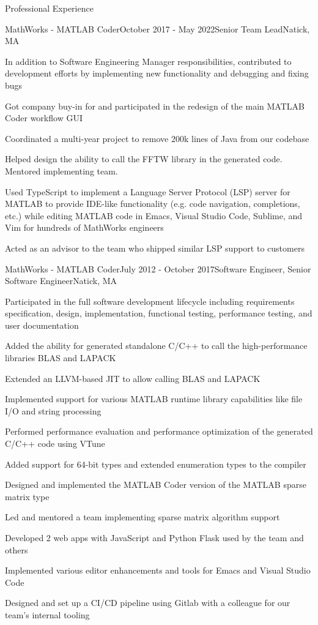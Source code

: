 \documentclass[
	usletter %
	10pt, %
]{resume} %
\begin{document}
\begin{rSection}{Professional Experience}
	\begin{rSubsection}{MathWorks - MATLAB Coder}{October 2017 - May 2022}{Senior Team Lead}{Natick, MA}
		\item In addition to Software Engineering Manager responsibilities, contributed to development efforts by implementing new functionality and debugging and fixing bugs
		\item Got company buy-in for and participated in the redesign of the main MATLAB Coder workflow GUI
		\item Coordinated a multi-year project to remove 200k lines of Java from our codebase
		\item Helped design the ability to call the FFTW library in the generated code. Mentored implementing team.
		\item Used TypeScript to implement a Language Server Protocol (LSP) server for MATLAB to provide IDE-like functionality (e.g. code navigation, completions, etc.) while editing MATLAB code in Emacs, Visual Studio Code, Sublime, and Vim for hundreds of MathWorks engineers
		\item Acted as an advisor to the team who shipped similar LSP support to customers
	\end{rSubsection}


	\begin{rSubsection}{MathWorks - MATLAB Coder}{July 2012 - October 2017}{Software Engineer, Senior Software Engineer}{Natick, MA}
		\item Participated in the full software development lifecycle including requirements specification, design, implementation, functional testing, performance testing, and user documentation
		\item Added the ability for generated standalone C/C++ to call the high-performance libraries BLAS and LAPACK
		\item Extended an LLVM-based JIT to allow calling BLAS and LAPACK
		\item Implemented support for various MATLAB runtime library capabilities like file I/O and string processing
		\item Performed performance evaluation and performance optimization of the generated C/C++ code using VTune
		\item Added support for 64-bit types and extended enumeration types to the compiler
		\item Designed and implemented the MATLAB Coder version of the MATLAB sparse matrix type
		\item Led and mentored a team implementing sparse matrix algorithm support
		\item Developed 2 web apps with JavaScript and Python Flask used by the team and others
		\item Implemented various editor enhancements and tools for Emacs and Visual Studio Code
		\item Designed and set up a CI/CD pipeline using Gitlab with a colleague for our team's internal tooling
	\end{rSubsection}


\end{rSection}
\end{document}
